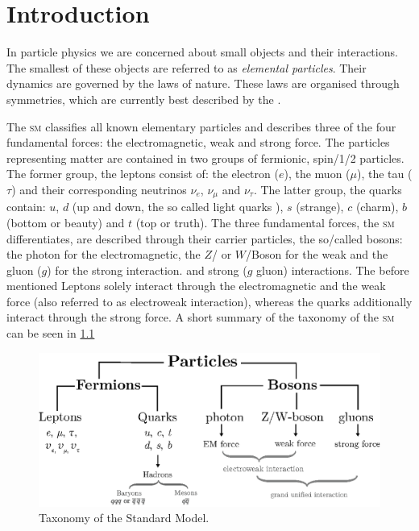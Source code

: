 \documentclass[../../index.tex]{subfiles}
\begin{document}
\chapter{Introduction}
In particle physics we are concerned about small objects and their interactions.
The smallest of these objects are referred to as \textit{elemental particles}.
Their dynamics are governed by the laws of nature. These laws are organised
through symmetries, which are currently best described by the
.

The \textsc{sm} classifies all known elementary particles and describes three of
the four fundamental forces: the electromagnetic, weak and strong force. The
particles representing matter are contained in two groups of fermionic,
spin\-/1/2 particles. The former group, the leptons consist of: the electron
($e$), the muon ($\mu$), the tau ($\tau$) and their corresponding neutrinos
$\nu_e$, $\nu_\mu$ and $\nu_\tau$. The latter group, the quarks contain: $u$,
$d$ (up and down, the so called light quarks ), $s$ (strange), $c$ (charm), $b$
(bottom or beauty) and $t$ (top or truth). The three fundamental forces, the
\textsc{sm} differentiates, are described through their carrier particles, the
so\-/called bosons: the photon for the electromagnetic, the $Z$\-/ or
$W$\-/Boson for the weak and the gluon ($g$) for the strong interaction. and
strong ($g$ gluon) interactions. The before mentioned Leptons solely interact
through the electromagnetic and the weak force (also referred to as electroweak
interaction), whereas the quarks additionally interact through the strong force.
A short summary of the taxonomy of the \textsc{sm} can be seen in
\cref{fig:SMTaxonomy}
\begin{figure}
  \centering
  \includegraphics[width=\textwidth]{./images/standardModelTaxonomy.eps}
  \caption{Taxonomy of the Standard Model.}
  \label{fig:SMTaxonomy}
\end{figure}
\end{document}
